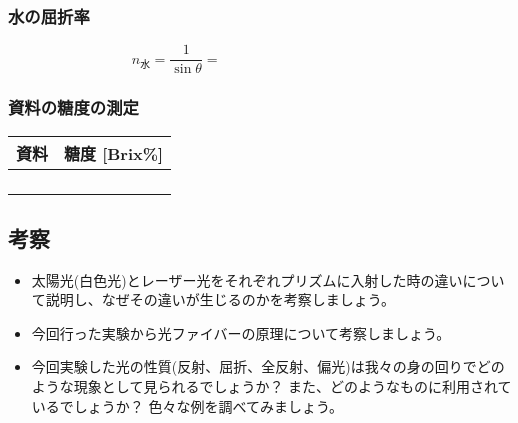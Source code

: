 \subsubsection*{水の屈折率}
\begin{equation}
n_{水} =\frac{1}{\sin\theta}=\hspace{5cm}\nonumber
\end{equation}

\bigskip\bigskip

\subsubsection*{資料の糖度の測定}
\hspace*{-\parindent}
\begin{tabular}{|p{4cm}|p{4cm}|}
\hline
資料 & 糖度 [Brix\%] \\
\hline\hline
&\\
\hline
&\\
\hline
&\\
\hline
&\\
\hline
\end{tabular}




\subsection*{考察}

\begin{itemize}

\item 太陽光(白色光)とレーザー光をそれぞれプリズムに入射した時の違いについて説明し、なぜその違いが生じるのかを考察しましょう。

\newpage

\item 今回行った実験から光ファイバーの原理について考察しましょう。

\vspace{7cm}

\item 今回実験した光の性質(反射、屈折、全反射、偏光)は我々の身の回りでどのような現象として見られるでしょうか？ また、どのようなものに利用されているでしょうか？  色々な例を調べてみましょう。


\end{itemize}

